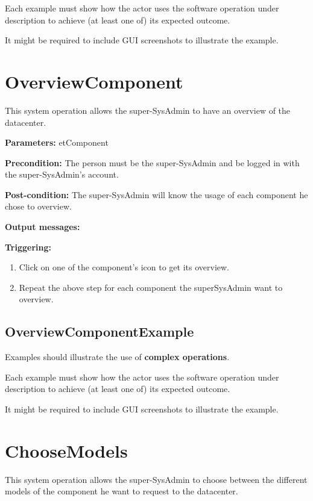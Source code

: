 Each example must show how the actor uses the software operation under
description to achieve (at least one of) its expected outcome.

It might be required to include GUI screenshots to illustrate the example.



\section{OverviewComponent}
\label{operation:overviewcomponent}
This system operation allows the super-SysAdmin to have an overview of the
datacenter.

\begin{description}

\item \textbf{Parameters:} etComponent
\item \textbf{Precondition:} The person must be the super-SysAdmin and be logged
in with the super-SysAdmin's account.
\item \textbf{Post-condition:} The super-SysAdmin will know the usage of each
component he chose to overview.
\item \textbf{Output messages:}

\item \textbf{Triggering:}
\begin{enumerate}
\item Click on one of the component's icon to get its overview.
\item Repeat the above step for each component the superSysAdmin want to
overview.
\end{enumerate}

 
\end{description}

\subsection{OverviewComponentExample}
Examples should illustrate the use of \textbf{complex operations}.

Each example must show how the actor uses the software operation under
description to achieve (at least one of) its expected outcome.

It might be required to include GUI screenshots to illustrate the example.




\section{ChooseModels}
\label{operation:choosemodels}
This system operation allows the super-SysAdmin to choose between the different
models of the component he want to request to the datacenter.

